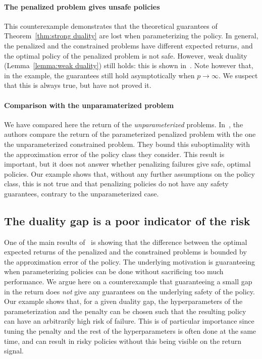 \paragraph{The penalized problem gives unsafe policies} This counterexample demonstrates that the theoretical guarantees of Theorem~\ref{thm:strong duality} are lost when parameterizing the policy. In general, the penalized and the constrained problems have different expected returns, and the optimal policy of the penalized problem is not safe. However, weak duality (Lemma~\ref{lemma:weak duality}) still holds: this is shown in~\cite{paternain2019safe}. Note however that, in the example, the guarantees still hold asymptotically when $p\to\infty$. We suspect that this is always true, but have not proved it.

\paragraph{Comparison with the unparamaterized problem} We have compared here the return of the\emph{ unparameterized} problems. In~\cite{paternain2019safe}, the authors compare the return of the parameterized penalized problem with the one the unparameterized constrained problem. They bound this suboptimality with the approximation error of the policy class they consider. This result is important, but it does not answer whether penalizing failures give safe, optimal policies. Our example shows that, without any further assumptions on the policy class, this is not true and that penalizing policies do not have any safety guarantees, contrary to the unparameterized case.

\subsection{The duality gap is a poor indicator of the risk} \label{sec:value unreliable}
One of the main results of~\cite{paternain2019safe} is showing that the difference between the optimal expected returns of the penalized and the constrained problems is bounded by the approximation error of the policy. The underlying motivation is guaranteeing when parameterizing policies can be done without sacrificing too much performance. We argue here on a counterexample that guaranteeing a small gap in the return does\emph{ not} give any guarantees on the underlying safety of the policy. Our example shows that, for a given duality gap, the hyperparameters of the parameterization and the penalty can be chosen such that the resulting policy can have an arbitrarily high risk of failure. This is of particular importance since tuning the penalty and the rest of the hyperparameters is often done at the same time, and can result in risky policies without this being visible on the return signal.


